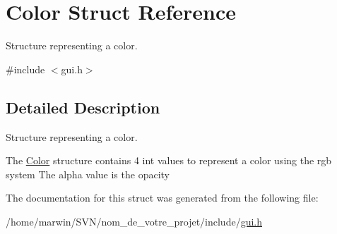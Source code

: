 \hypertarget{struct_color}{\section{Color Struct Reference}
\label{struct_color}
}


Structure representing a color.  




{\ttfamily \#include $<$gui.\-h$>$}



\subsection{Detailed Description}
Structure representing a color. 

The \hyperlink{struct_color}{Color} structure contains 4 int values to represent a color using the rgb system The alpha value is the opacity 

The documentation for this struct was generated from the following file\-:\begin{DoxyCompactItemize}
\item 
/home/marwin/\-S\-V\-N/nom\-\_\-de\-\_\-votre\-\_\-projet/include/\hyperlink{gui_8h}{gui.\-h}\end{DoxyCompactItemize}
